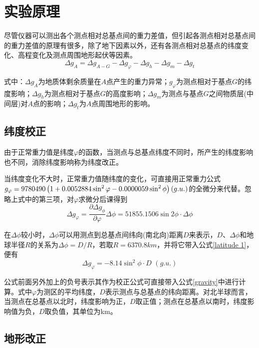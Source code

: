 \section{实验原理}
尽管仪器可以测出各个测点相对总基点间的重力差值，但引起各测点相对总基点间的重力差值的原理有很多，除了地下因素以外，还有各测点相对总基点的纬度变化、高程变化及测点周围地形起伏等因素。
\begin{equation}
\label{gravity}
	\varDelta g_A=\varDelta g_{A-G}-\varDelta g_{\varphi}-\varDelta g_h-\varDelta g_m-\varDelta g_t
\end{equation}

式中：$\varDelta g_A$为地质体剩余质量在$A$点产生的重力异常；$g_{\varphi}$为测点相对于基点$G$的纬度影响；$\varDelta g_h$为测点相对于基点$G$的高度影响；$\varDelta g_m$为测点与基点$G$之间物质层(中间层)对$A$点的影响；$\varDelta g_t$为$A$点周围地形的影响。

\subsection{纬度校正}
由于正常重力值是纬度$\varphi$的函数，当测点与总基点纬度不同时，所产生的纬度影响也不同，消除纬度影响称为纬度改正。

当纬度变化不大时，正常重力值随纬度的变化，可直接用正常重力公式$g_{\varphi}=9780490\\ \left( 1+\text{0.0052884}\sin ^2\varphi -\text{0.0000059}\sin ^2\phi \right) \left( g.u. \right) $的全微分来代替。忽略上式中的第三项，对$\varphi$求微分后课得到
\begin{equation}
\label{latitude 1}
\varDelta g_{\varphi}=\frac{\partial \varDelta g_{\phi}}{\partial \varphi}\varDelta \phi =\text{51855.1506}\sin 2\phi \cdot \varDelta \phi 
\end{equation}

在$\varDelta \phi$较小时，$\varDelta \phi$可以用测点到总基点间纬向(南北向)距离$D$来表示，$D$、$\varDelta \phi$和地球半径$R$的关系为$\varDelta \phi =D/R$，若取$R=6370.8km$，并将它带入公式\ref{latitude 1}，便有
\begin{equation}
	\varDelta g_{\varphi}=-\text{8.14}\sin ^2\phi \cdot D\,\,\left( g.u. \right) 
\end{equation}


公式前面另外加上的负号表示其作为校正公式可直接带入公式\ref{gravity}中进行计算。式中$\varphi$为测区的平均纬度，$D$表示测点与总基点的纬向距离。对北半球而言，当测点在总基点以北时，纬度影响为正，$D$取正值；测点在总基点以南时，纬度影响值为负，$D$取负值，其单位为km。
\subsection{地形改正}
